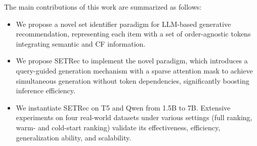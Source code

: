 The main contributions of this work are summarized as follows:
\begin{itemize}[leftmargin=*]
    \item We propose a novel set identifier paradigm for LLM-based generative recommendation, representing each item with a set of order-agnostic tokens integrating semantic and CF information. 
    \item 
    We propose SETRec to implement the novel paradigm, which introduces a query-guided generation mechanism with a sparse attention mask to achieve simultaneous generation without token dependencies, significantly boosting inference efficiency. 
    \item We instantiate SETRec on T5 and Qwen from 1.5B to 7B. Extensive experiments on four real-world datasets under various settings (\eg full ranking, warm- and cold-start ranking) validate its effectiveness, efficiency, generalization ability, and scalability. 
\end{itemize}